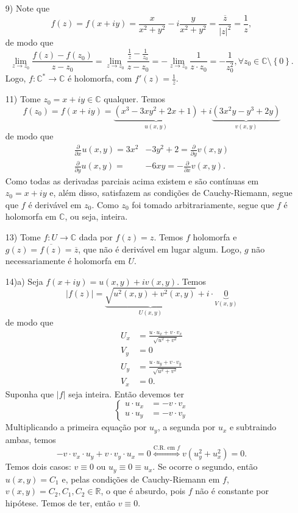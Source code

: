 \documentclass[12pt,a4paper]{article}
\begin{document}
\begin{enumerate}
	\item[9)] Note que
	$$
	f(z) = f(x+iy) = \frac{x}{x^2+y^2} - i\frac{y}{x^2+y^2} = \frac{\overline{z}}{|z|^2} = \frac{1}{z},
	$$
	de modo que
	$$
	\lim\limits_{z\to z_0} \frac{f(z) - f(z_0)}{z - z_0} = \lim\limits_{z\to z_0} \frac{\frac{1}{z} - \frac{1}{z_0}}{z - z_0} = -\lim\limits_{z\to z_0} \frac{1}{z\cdot z_0} = -\frac{1}{z_0^2}, \forall z_0\in\mathbb{C}\setminus\left\{0\right\}.
	$$
	Logo, $f:\mathbb{C}^*\to\mathbb{C}$ é holomorfa, com $\displaystyle{f'(z) = \frac{1}{z}}$.
	
	\item[11)] Tome $z_0 = x + iy\in\mathbb{C}$ qualquer. Temos
	$$
	f(z_0) = f(x+iy) = \underbrace{(x^3 - 3xy^2 + 2x + 1)}_{u(x,y)} + i\underbrace{(3x^2y - y^3 + 2y)}_{v(x,y)}
	$$
	de modo que
	\begin{align*} 
	\frac{\partial}{\partial x}u(x,y) = 3x^2 &- 3y^2 + 2 = \frac{\partial}{\partial y}v(x,y) \\
	\frac{\partial}{\partial y}u(x,y) = &-6xy = - \frac{\partial}{\partial x}v(x,y).
	\end{align*}
	Como todas as derivadas parciais acima existem e são contínuas em $z_0 = x+iy$ e, além disso, satisfazem as condições de Cauchy-Riemann, segue que $f$ é derivável em $z_0$. Como $z_0$ foi tomado arbitrariamente, segue que $f$ é holomorfa em $\mathbb{C}$, ou seja, inteira.
	
	\item[13)] Tome $f:U\to\mathbb{C}$ dada por $f(z) = z$. Temos $f$ holomorfa e $g(z) = \overline{f(z)} = \overline{z}$, que não é derivável em lugar algum. Logo, $g$ não necessariamente é holomorfa em $U$.
	
	\item[14)a)] Seja $f(x+iy) = u(x,y) + iv(x,y)$. Temos
	$$
	|f(z)| = \underbrace{\sqrt{u^2(x,y)+v^2(x,y)}}_{U(x,y)} + i\cdot\underbrace{0}_{V(x,y)}
	$$
	de modo que
	\begin{align*} 
	U_x &= \frac{u\cdot u_x + v\cdot v_x}{\sqrt{u^2+v^2}} \\
	V_y &= 0 \\
	U_y &= \frac{u\cdot u_y + v\cdot v_y}{\sqrt{u^2+v^2}} \\
	V_x &= 0.
	\end{align*}
	Suponha que $|f|$ seja inteira. Então devemos ter
	\begin{equation*}
	\begin{cases}
	u\cdot u_x &= -v\cdot v_x \\
	u\cdot u_y &= -v\cdot v_y
	\end{cases}
	\end{equation*}
	Multiplicando a primeira equação por $u_y$, a segunda por $u_x$ e subtraindo ambas, temos
	$$
	-v\cdot v_x\cdot u_y + v\cdot v_y\cdot u_x = 0 \stackrel{\text{C.R. em }f}{\Longleftrightarrow} v(u_y^2 + u_x^2) = 0.
	$$
	Temos dois casos: $v\equiv 0$ ou $u_y\equiv 0\equiv u_x$. Se ocorre o segundo, então $u(x,y) = C_1$ e, pelas condições de Cauchy-Riemann em $f$, $v(x,y) = C_2, C_1,C_2\in\mathbb{R}$, o que é absurdo, pois $f$ não é constante por hipótese. Temos de ter, então $v\equiv 0$.
	

\end{enumerate}
\end{document}
